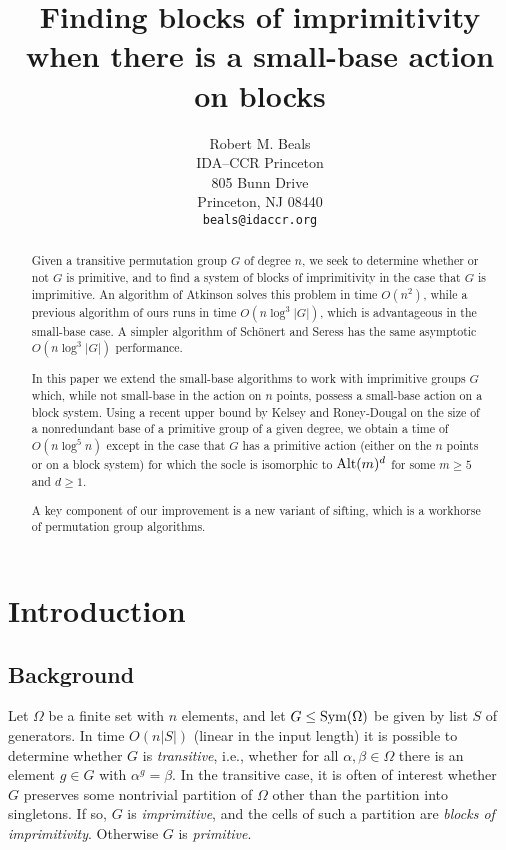 \documentclass[12pt]{article}
\title{Finding blocks of imprimitivity\\
when there is a small-base action on blocks}
\author{Robert M. Beals\\
  IDA--CCR Princeton\\
  805 Bunn Drive\\
  Princeton, NJ 08440\\
  {\tt beals@idaccr.org}}
\newcommand{\Sym}{{\rm Sym}}
\newcommand{\Alt}{{\rm Alt}}
\begin{document}
  
\maketitle

\begin{abstract}
  Given a transitive
  permutation group $G$ of degree $n$, we seek to determine
  whether or not $G$ is primitive, and to find a system of blocks
  of imprimitivity in the case that $G$ is imprimitive.  An algorithm of
  Atkinson solves this problem in time $O(n^2)$, while a previous algorithm
  of ours runs in time $O(n\log^3|G|)$, which is advantageous
  in the small-base case.
  A simpler algorithm of Sch\"onert and Seress has the same
  asymptotic $O(n\log^3|G|)$ performance.

  In this paper we extend the small-base algorithms to work with
  imprimitive groups $G$ which, while not small-base in the
  action on $n$ points, possess a small-base action on a block system.
  Using a recent upper bound by Kelsey and
  Roney-Dougal on the size of a
  nonredundant base of a primitive group of a given degree,
  we obtain a time
  of $O(n\log^5 n)$ except in the case that
  $G$ has a primitive action
  (either on the $n$ points or on a block system) for which the socle
  is isomorphic to $\Alt(m)^d$ for some $m\geq 5$ and $d\geq 1$.
  
  A key component of our improvement is a new variant of
  sifting, which is a workhorse of permutation group
  algorithms. 

\end{abstract}

\section{Introduction}
\subsection{Background}
Let $\Omega$ be a finite set with $n$ elements, and let
$G\leq\Sym(\Omega)$ be given by list $S$ of generators.
In time $O(n|S|)$ (linear in the input length)
it is possible to determine whether $G$
is {\em transitive}\/, i.e., whether for all $\alpha,\beta\in\Omega$
there is an element $g\in G$ with $\alpha^g=\beta$.
In the transitive case, it is often of interest whether
$G$ preserves some nontrivial partition of $\Omega$ other than
the partition into singletons.  If so, $G$ is 
{\em imprimitive}\/, and the cells of such a partition
are {\em blocks of imprimitivity}\/. Otherwise $G$ is {\em primitive}\/.
\end{document}

